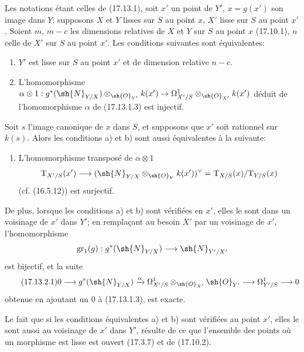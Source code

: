 \begin{proposition}[17.13.2]
\label{IV.17.13.2}
Les notations étant celles de (17.13.1), soit $x'$ un point de $Y'$, $x=g(x')$ son image dans $Y$; supposons $X$ et $Y$ lisses sur $S$ au point $x$, $X'$ lisse sur $S$ au point $x'$. Soient $m$, $m-c$ les dimensions relatives de $X$ et $Y$ sur $S$ au point $x$ (17.10.1), $n$ celle de $X'$ sur $S$ au point $x'$. Les conditions suivantes sont équivalentes:
\begin{enumerate}
  \item[a)] $Y'$ est lisse sur $S$ au point $x'$ et de dimension relative $n-c$.
  \item[b)] L'homomorphisme $\alpha\otimes1:g^*(\sh{N}_{Y/X})\otimes_{\sh{O}_{Y'}}k(x')\to\Omega^1_{X'/S}\otimes_{\sh{O}_{X'}}k(x')$ déduit de l'homomorphisme $\alpha$ de (17.13.1.3) est injectif.
\end{enumerate}
Soit $s$ l'image canonique de $x$ dans $S$, et supposons que $x'$ soit rationnel sur $k(s)$. Alors les conditions a) et b) sont aussi équivalentes à la suivante:
\begin{enumerate}
  \item[b')] L'homomorphisme transposé de $\alpha\otimes1$
  \[
  \mathrm{T}_{X'/S}(x')\to(\sh{N}_{Y/X}\otimes_{\sh{O}_Y}k(x'))^\vee=\mathrm{T}_{X/S}(x)/\mathrm{T}_{Y/S}(x)
  \]
  (cf. (16.5.12)) est surjectif.
\end{enumerate}
De plus, lorsque les conditions a) et b) sont vérifiées en $x'$, elles le sont dans un voisinage de $x'$ dans $Y'$; en remplaçant au besoin $X'$ par un voisinage de $x'$, l'homomorphisme
\[
\operatorname{gr}_1(g):g^*(\sh{N}_{Y/X})\to\sh{N}_{Y'/X'}
\]
est bijectif, et la suite
\[
\label{IV.17.13.2.1}
\tag{17.13.2.1}
0\to g^*(\sh{N}_{Y/X})\xrightarrow{\alpha}\Omega^1_{X'/S}\otimes_{\sh{O}_{X'}}\sh{O}_{Y'}\to\Omega^1_{Y'/S}\to0
\]
obtenue en ajoutant un $0$ à (17.13.1.3), est exacte.
\end{proposition}

Le fait que si les conditions équivalentes a) et b) sont vérifiées au point $x'$, elles le sont aussi au voisinage de $x'$ dans $Y'$, résulte de ce que l'ensemble des points où un morphisme est lisse est ouvert (17.3.7) et de (17.10.2).


